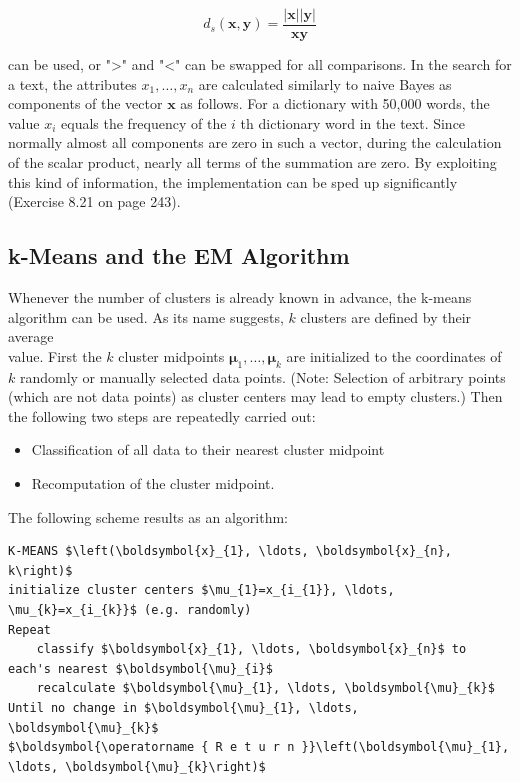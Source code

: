\documentclass[10pt]{book}
\begin{document}
$$
d_{s}(\boldsymbol{x}, \boldsymbol{y})=\frac{|\boldsymbol{x}||\boldsymbol{y}|}{\boldsymbol{x} \boldsymbol{y}}
$$

can be used, or ">" and "<" can be swapped for all comparisons. In the search for a text, the attributes $x_{1}, \ldots, x_{n}$ are calculated similarly to naive Bayes as components of the vector $\boldsymbol{x}$ as follows. For a dictionary with 50,000 words, the value $x_{i}$ equals the frequency of the $i$ th dictionary word in the text. Since normally almost all components are zero in such a vector, during the calculation of the scalar product, nearly all terms of the summation are zero. By exploiting this kind of information, the implementation can be sped up significantly (Exercise 8.21 on page 243).

\subsection{k-Means and the EM Algorithm}
Whenever the number of clusters is already known in advance, the k-means algorithm can be used. As its name suggests, $k$ clusters are defined by their average\\
value. First the $k$ cluster midpoints $\boldsymbol{\mu}_{1}, \ldots, \boldsymbol{\mu}_{k}$ are initialized to the coordinates of $k$ randomly or manually selected data points. (Note: Selection of arbitrary points (which are not data points) as cluster centers may lead to empty clusters.) Then the following two steps are repeatedly carried out:


\begin{itemize}
  \item Classification of all data to their nearest cluster midpoint
  \item Recomputation of the cluster midpoint.
\end{itemize}

The following scheme results as an algorithm:

\begin{verbatim}
K-MEANS $\left(\boldsymbol{x}_{1}, \ldots, \boldsymbol{x}_{n}, k\right)$
initialize cluster centers $\mu_{1}=x_{i_{1}}, \ldots, \mu_{k}=x_{i_{k}}$ (e.g. randomly)
Repeat
    classify $\boldsymbol{x}_{1}, \ldots, \boldsymbol{x}_{n}$ to each's nearest $\boldsymbol{\mu}_{i}$
    recalculate $\boldsymbol{\mu}_{1}, \ldots, \boldsymbol{\mu}_{k}$
Until no change in $\boldsymbol{\mu}_{1}, \ldots, \boldsymbol{\mu}_{k}$
$\boldsymbol{\operatorname { R e t u r n }}\left(\boldsymbol{\mu}_{1}, \ldots, \boldsymbol{\mu}_{k}\right)$
\end{verbatim}
\end{document}
